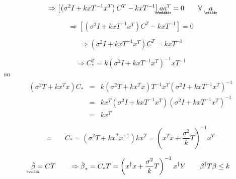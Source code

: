 \documentclass{article}
\begin{document}
\begin{equation*}
\Rightarrow \left[ \left( \sigma ^{2}I+kxT^{-1}x^{T}\right) C^{T}-kxT^{-1}%
\right] 
\underaccent{\wtilde}{a}%
\underaccent{\wtilde}{a}%
^{T}=0\qquad \forall \quad 
\underaccent{\wtilde}{a}%
\end{equation*}

\begin{equation*}
\Rightarrow \left[ \left( \sigma ^{2}I+kxT^{-1}x^{T}\right) C^{T}-kxT^{-1}%
\right] =0
\end{equation*}

\begin{equation*}
\Rightarrow \left( \sigma ^{2}I+kxT^{-1}x^{T}\right) C^{T}=kxT^{-1}
\end{equation*}

\begin{equation*}
\Rightarrow C_{\ast }^{T}=k\left( \sigma ^{2}I+kxT^{-1}x^{T}\right)
^{-1}xT^{-1}
\end{equation*}%
so%
\begin{eqnarray*}
\left( \sigma ^{2}T+kx^{T}x\right) C_{\ast } &=&k\left( \sigma
^{2}T+kx^{T}x\right) T^{-1}x^{T}\left( \sigma ^{2}I+kxT^{-1}x^{T}\right)
^{-1} \\
&=&kx^{T}\left( \sigma ^{2}I+kxT^{-1}x^{T}\right) \left( \sigma
^{2}I+kxT^{-1}x^{T}\right) ^{-1} \\
&=&kx^{T}
\end{eqnarray*}

\begin{equation*}
\therefore \qquad C_{\ast }=\left( \sigma ^{2}T+kx^{T}x^{-1}\right)
kx^{T}=\left( x^{T}x+\frac{\sigma ^{2}}{k}T\right) ^{-1}x^{T}
\end{equation*}

\begin{equation*}
\underaccent{\wtilde}{\hat{\beta}}%
=CT\qquad \Rightarrow \hat{\beta}_{\ast }=C_{\ast }T=\left( x^{\dagger }x+%
\frac{\sigma ^{2}}{k}T\right) ^{-1}x^{\dagger }Y\qquad \beta ^{\dagger
}T\beta \leq k
\end{equation*}
\end{document}

